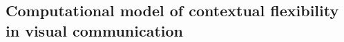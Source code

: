 \documentclass[9pt,twocolumn,twoside]{pnas-new}
\begin{document}






\subsection*{Computational model of contextual flexibility in visual communication}
\end{document}
